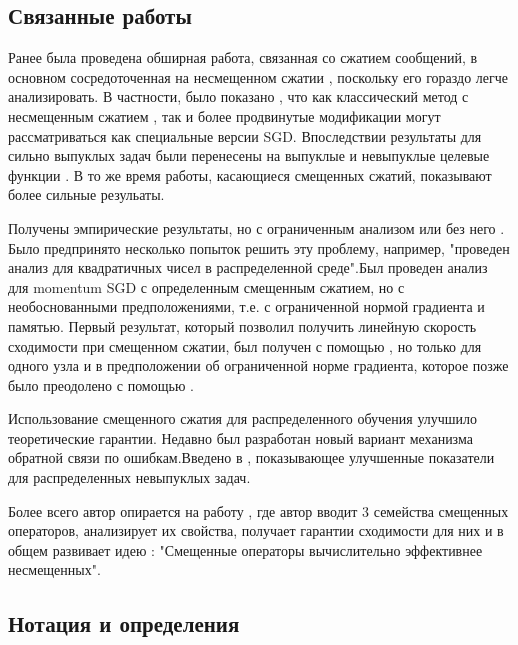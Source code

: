 \documentclass[12pt, twoside]{article}
\begin{document}
\subsection{Связанные работы}
Ранее была проведена обширная работа, связанная со сжатием сообщений, в основном сосредоточенная
на несмещенном сжатии \cite{alistarh2017qsgd}, поскольку его гораздо легче анализировать. В частности, было
показано \cite{gorbunov2019unifiedtheorysgdvariance}, что как классический метод с несмещенным сжатием \cite{alistarh2017qsgd}, так и более продвинутые
модификации \cite{mishchenko2023distributedlearningcompressedgradient} могут рассматриваться как специальные версии SGD. Впоследствии результаты
\cite{gorbunov2019unifiedtheorysgdvariance} для сильно выпуклых задач были перенесены на выпуклые \cite{li2020unifiedanalysisstochasticgradient} и невыпуклые целевые функции
\cite{vogels2020powersgdpracticallowrankgradient}. В то же время работы, касающиеся смещенных сжатий, показывают более сильные резульаты.


Получены эмпирические результаты, но с ограниченным анализом или без него \cite{pmlr-v80-wu18d}. Было предпринято несколько попыток решить эту проблему, например, "проведен анализ для квадратичных чисел в распределенной среде".Был проведен анализ для momentum SGD с определенным смещенным сжатием, но с необоснованными предположениями, т.е. с ограниченной нормой градиента и памятью. Первый результат, который позволил получить линейную скорость сходимости при смещенном сжатии, был получен с помощью \cite{shi2024globalmomentumcompressionsparse}, но только для одного узла и в
предположении об ограниченной норме градиента, которое позже было преодолено с помощью \cite{karimireddy2019errorfeedbackfixessignsgd}.


Использование смещенного сжатия для распределенного обучения
улучшило теоретические гарантии. Недавно был разработан новый вариант механизма обратной связи по ошибкам.Введено в \cite{fatkhullin2021ef21bellswhistles}, показывающее улучшенные показатели для распределенных невыпуклых задач.

Более всего автор опирается на работу \cite{beznosikov2024biasedcompressiondistributedlearning}, где автор вводит 3 семейства смещенных операторов, анализирует их свойства, получает гарантии сходимости для них и в общем развивает идею : "Смещенные операторы вычислительно эффективнее несмещенных".
\subsection{Нотация и определения}
\end{document}
